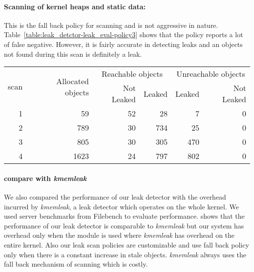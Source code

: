 \paragraph{Scanning of kernel heaps and static data:} This is the fall back policy for scanning and is not aggressive in nature.  Table~\ref{table:leak_detctor-leak_eval-policy3} shows that the policy reports a lot of false negative. However, it is fairly accurate in detecting leaks and an objects not found during this scan is definitely a leak.



\begin{table*}
\begin{center}
\begin{tabular}{|r|r|r|r|r|r|}
  \hline
  \multirow{2}{*}{scan} & \multirow{2}{*}{Allocated objects} & \multicolumn{2}{|c|}{Reachable objects} & \multicolumn{2}{|c|}{Unreachable objects} \\
  \hhline{~~----}
  & & Not Leaked & Leaked & Leaked & Not Leaked\\
  \hline
  1 & 59 & 52 & 28 & 7 & 0 \\
  \hline
  2 & 789 & 30 & 734 & 25 & 0 \\
  \hline
  3 & 805 & 30 & 305 & 470 & 0 \\
    \hline
  4 & 1623 & 24 & 797 & 802 & 0 \\ \hline
  \hline
\end{tabular}
\caption[Profile of allocated objects with leak scan policies. The collector performs scan on all kernel allocated pages.]{\label{table:leak_detctor-leak_eval-policy3}The profile of the allocated objects and detected memory leaks when the scanner thread (collector) scans all the kernel allocated pages.}
\end{center}
\end{table*}




\paragraph{compare with \emph{kmemleak}}
We also compared the performance of our leak detector with the overhead incurred by \emph{kmemleak}, a leak detector which operates on the whole kernel. We used server benchmarks from Filebench to evaluate performance.  shows that the performance of our leak detector is comparable to \emph{kmemleak} but our system has overhead only when the module is used where \emph{kmemleak} has overhead on the entire kernel. Also our leak scan policies are customizable and use fall back policy only when there is a constant increase in stale objects. \emph{kmemleak} always uses the fall back mechanism of scanning which is costly.


